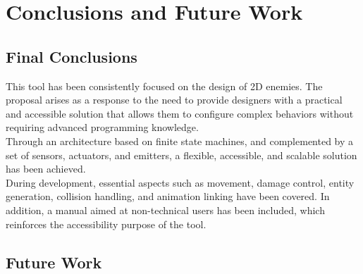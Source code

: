 \chapter*{Conclusions and Future Work}
\label{cap:conclusions}
\section*{Final Conclusions}
This tool has been consistently focused on the design of 2D enemies. The proposal arises as a response to the need to provide designers with a practical and accessible solution that allows them to configure complex behaviors without requiring advanced programming knowledge.\\
Through an architecture based on finite state machines, and complemented by a set of sensors, actuators, and emitters, a flexible, accessible, and scalable solution has been achieved.\\
During development, essential aspects such as movement, damage control, entity generation, collision handling, and animation linking have been covered. In addition, a manual aimed at non-technical users has been included, which reinforces the accessibility purpose of the tool.


\section*{Future Work}

